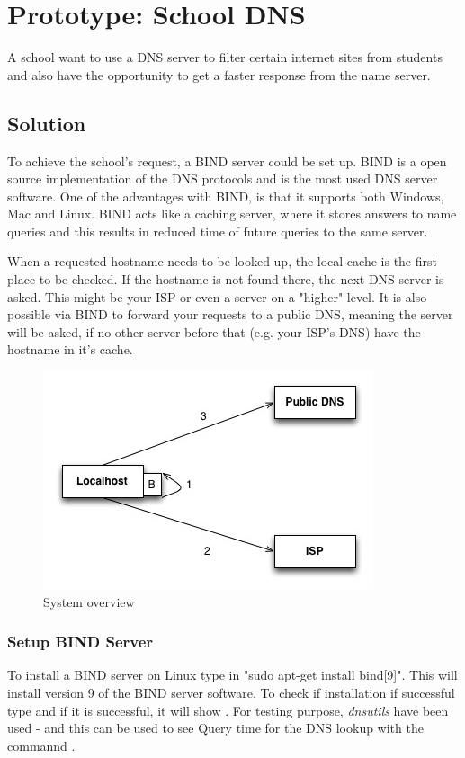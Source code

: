 \documentclass[Preamble]{subfiles}
\begin{document}
\chapter{Prototype: School DNS}
A school want to use a DNS server to filter certain internet sites from students and also have the opportunity to get a faster response from the name server. 

\section{Solution}
To achieve the school's request, a BIND server could be set up. 
BIND is a open source implementation of the DNS protocols and is the most used DNS server software. 
One of the advantages with BIND, is that it supports both Windows, Mac and Linux. 
BIND acts like a caching server, where it stores answers to name queries and this results in reduced time of future queries to the same server.

When a requested hostname needs to be looked up, the local cache is the first place to be checked. 
If the hostname is not found there, the next DNS server is asked. 
This might be your ISP or even a server on a "higher" level. 
It is also possible via BIND to forward your requests to a public DNS, meaning the server will be asked, if no other server before that (e.g. your ISP's DNS) have the hostname in it's cache. 

\begin{figure}[hbtp]
\centering
\includegraphics[scale=0.5]{../../Protoypes/DNS/ForwardingDiagram.jpg}
\caption{System overview}
\label{fig:Forwarding}
\end{figure}


\subsection{Setup BIND Server}
To install a BIND server on Linux type in "sudo apt-get install bind[9]". This will install version 9 of the BIND server software. To check if installation if successful type  and if it is successful, it will show . 
For testing purpose, \textit{dnsutils} have been used - and this can be used to see Query time for the DNS lookup with the commannd .
\end{document}
